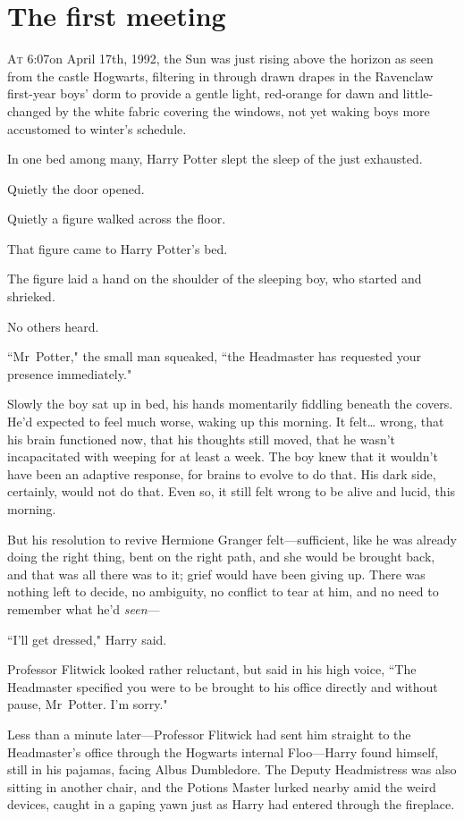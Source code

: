 
\section{The first meeting}

\lettrine{A}{t} 6:07\am on April 17th, 1992, the Sun was just rising above the horizon as seen from the castle Hogwarts, filtering in through drawn drapes in the Ravenclaw first-year boys' dorm to provide a gentle light, red-orange for dawn and little-changed by the white fabric covering the windows, not yet waking boys more accustomed to winter's schedule.

In one bed among many, Harry Potter slept the sleep of the just exhausted.

Quietly the door opened.

Quietly a figure walked across the floor.

That figure came to Harry Potter's bed.

The figure laid a hand on the shoulder of the sleeping boy, who started and shrieked.

No others heard.

``Mr~Potter," the small man squeaked, ``the Headmaster has requested your presence immediately."

Slowly the boy sat up in bed, his hands momentarily fiddling beneath the covers. He'd expected to feel much worse, waking up this morning. It felt{\ldots} wrong, that his brain functioned now, that his thoughts still moved, that he wasn't incapacitated with weeping for at least a week. The boy knew that it wouldn't have been an adaptive response, for brains to evolve to do that. His dark side, certainly, would not do that. Even so, it still felt wrong to be alive and lucid, this morning.

But his resolution to revive Hermione Granger felt—sufficient, like he was already doing the right thing, bent on the right path, and she would be brought back, and that was all there was to it; grief would have been giving up. There was nothing left to decide, no ambiguity, no conflict to tear at him, and no need to remember what he'd \emph{seen}—

``I'll get dressed," Harry said.

Professor Flitwick looked rather reluctant, but said in his high voice, ``The Headmaster specified you were to be brought to his office directly and without pause, Mr~Potter. I'm sorry."

Less than a minute later—Professor Flitwick had sent him straight to the Headmaster's office through the Hogwarts internal Floo—Harry found himself, still in his pajamas, facing Albus Dumbledore. The Deputy Headmistress was also sitting in another chair, and the Potions Master lurked nearby amid the weird devices, caught in a gaping yawn just as Harry had entered through the fireplace.

